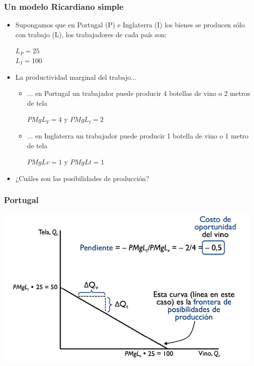 \documentclass{beamer}
\begin{document}
\begin{frame}
\frametitle{Un modelo Ricardiano simple}
\begin{itemize}
    \item Supongamos que en Portugal (P) e Inglaterra (I) los bienes se producen sólo con trabajo (L), los trabajadores de cada país son:
    \begin{itemize}\vspace{2mm}
        \begin{center}
            $L_P=25$\\
            $L_I=100$
        \end{center}\vspace{2mm}
    \end{itemize}
    \item La productividad marginal del trabajo... \begin{itemize}
        \item ... en Portugal un trabajador puede producir 4 botellas de vino o 2 metros de tela \\\vspace{2mm}
        \begin{center}
             $PMgL_V = 4$ y $PMgL_t = 2$
        \end{center}\vspace{2mm}
        \item ... en Inglaterra un trabajador puede producir 1 botella de vino o 1 metro de tela \\\vspace{2mm}
        \begin{center}
            $PMgLv = 1$ y $PMgLt = 1$
        \end{center}\vspace{2mm}
        \end{itemize} 
     \item ¿Cuáles son las posibilidades de producción?    
\end{itemize} 
\end{frame}

\begin{frame}
\frametitle{Portugal}
\centering
\includegraphics[scale=0.6]{Slides Principios de Economia/Figures/Tema_03_1_portugal.png}
\end{frame}
\end{document}

